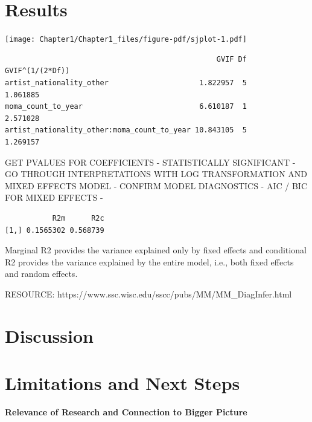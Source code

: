 \documentclass[
  letterpaper,
  DIV=11,
  numbers=noendperiod]{scrreprt}
\begin{document}
\hypertarget{results}{%
\chapter{Results}\label{results}}

\texttt{[image: Chapter1/Chapter1\_files/figure-pdf/sjplot-1.pdf]}

\begin{verbatim}
                                                 GVIF Df GVIF^(1/(2*Df))
artist_nationality_other                     1.822957  5        1.061885
moma_count_to_year                           6.610187  1        2.571028
artist_nationality_other:moma_count_to_year 10.843105  5        1.269157
\end{verbatim}

GET PVALUES FOR COEFFICIENTS - STATISTICALLY SIGNIFICANT - GO THROUGH
INTERPRETATIONS WITH LOG TRANSFORMATION AND MIXED EFFECTS MODEL -
CONFIRM MODEL DIAGNOSTICS - AIC / BIC FOR MIXED EFFECTS -

\begin{verbatim}
           R2m      R2c
[1,] 0.1565302 0.568739
\end{verbatim}

Marginal R2 provides the variance explained only by fixed effects and
conditional R2 provides the variance explained by the entire model,
i.e., both fixed effects and random effects.

RESOURCE: https://www.ssc.wisc.edu/sscc/pubs/MM/MM\_DiagInfer.html

\hypertarget{discussion}{%
\chapter{Discussion}\label{discussion}}

\hypertarget{limitations-and-next-steps}{%
\chapter{Limitations and Next Steps}\label{limitations-and-next-steps}}

\textbf{Relevance of Research and Connection to Bigger Picture}
\end{document}
